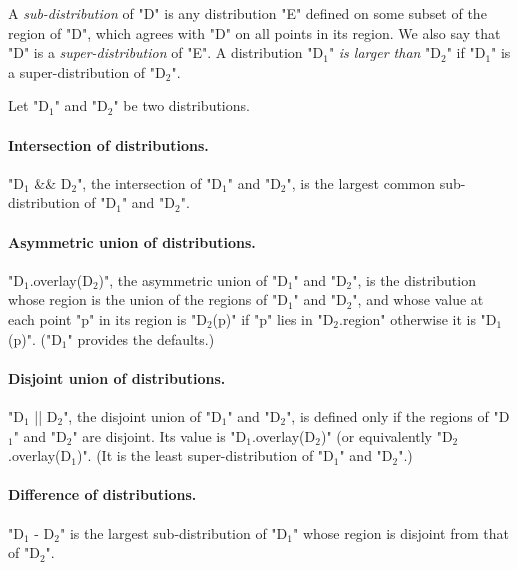 A {\em sub-distribution} of \xcd"D" is
any distribution \xcd"E" defined on some subset of the region of
\xcd"D", which agrees with \xcd"D" on all points in its region.
We also say that \xcd"D" is a {\em super-distribution} of
\xcd"E". A distribution \xcdmath"D$_1$" {\em is larger than}
\xcdmath"D$_2$" if \xcdmath"D$_1$" is a super-distribution of
\xcdmath"D$_2$".

Let \xcdmath"D$_1$" and \xcdmath"D$_2$" be two distributions.  


\paragraph{Intersection of distributions.}
\xcdmath"D$_1$ && D$_2$", the intersection of \xcdmath"D$_1$"
and \xcdmath"D$_2$", is the largest common sub-distribution of
\xcdmath"D$_1$" and \xcdmath"D$_2$".

\paragraph{Asymmetric union of distributions.}
\xcdmath"D$_1$.overlay(D$_2$)", the asymmetric union of
\xcdmath"D$_1$" and \xcdmath"D$_2$", is the distribution whose
region is the union of the regions of \xcdmath"D$_1$" and
\xcdmath"D$_2$", and whose value at each point \xcd"p" in its
region is \xcdmath"D$_2$(p)" if \xcdmath"p" lies in
\xcdmath"D$_2$.region" otherwise it is \xcdmath"D$_1$(p)".
(\xcdmath"D$_1$" provides the defaults.)

\paragraph{Disjoint union of distributions.}
\xcdmath"D$_1$ || D$_2$", the disjoint union of \xcdmath"D$_1$"
and \xcdmath"D$_2$", is defined only if the regions of
\xcdmath"D$_1$" and \xcdmath"D$_2$" are disjoint. Its value is
\xcdmath"D$_1$.overlay(D$_2$)" (or equivalently
\xcdmath"D$_2$.overlay(D$_1$)".  (It is the least
super-distribution of \xcdmath"D$_1$" and \xcdmath"D$_2$".)

\paragraph{Difference of distributions.}
\xcdmath"D$_1$ - D$_2$" is the largest sub-distribution of
\xcdmath"D$_1$" whose region is disjoint from that of
\xcdmath"D$_2$".


